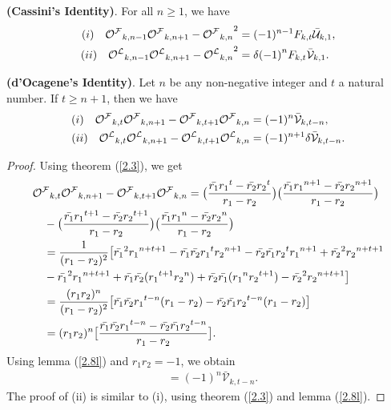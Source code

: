\begin{theorem}\textbf{(Cassini's Identity)}. For all $n\geq{1}$, we have\label{2.10t}
\begin{align*}
(i)\quad{{\mathcal{O^F}}}_{k,n-1}{{\mathcal{O^F}}}_{k,n+1}-{{{\mathcal{O^F}}}_{k,n}}^2&=(-1)^{n-1}F_{k,t}\bar{\mathcal{U}}_{k,1},\\
(ii)\quad{{\mathcal{O^L}}}_{k,n-1}{{\mathcal{O^L}}}_{k,n+1}-{{{\mathcal{O^L}}}_{k,n}}^2&=\delta{(-1)}^{n}{{F}_{k,t}}\bar{\mathcal{V}}_{k,1}.
\end{align*}
\end{theorem}
\begin{theorem}\textbf{(d'Ocagene's Identity)}. Let $n$ be any non-negative integer and $t$ a natural number. If $t\geq {n+1}$, then we have\label{2.11t}
\begin{align*}
(i)\quad{{\mathcal{O^F}}}_{k,t}{{\mathcal{O^F}}}_{k,n+1}-{{\mathcal{O^F}}}_{k,t+1}{{\mathcal{O^F}}}_{k,n}&=(-1)^n \bar{\mathcal{V}}_{k,t-n},\\
(ii)\quad{{\mathcal{O^L}}}_{k,t}{{\mathcal{O^L}}}_{k,n+1}-{{\mathcal{O^L}}}_{k,t+1}{{\mathcal{O^L}}}_{k,n}&=(-1)^{n+1}\delta \bar{\mathcal{V}}_{k,t-n}.
\end{align*}
\end{theorem}
\begin{proof}
Using theorem (\ref{2.3}), we get
\begin{align*}
&{{\mathcal{O^F}}}_{k,t}{{\mathcal{O^F}}}_{k,n+1}-{{\mathcal{O^F}}}_{k,t+1}{{\mathcal{O^F}}}_{k,n}=\big(\dfrac{\bar{r_1}{{r_1}}^{t}-\bar{r_2}{r_{2}}^{t}}{r_1-r_2}\big)\big(\dfrac{\bar{r_1}{{r_1}}^{n+1}-\bar{r_2}{r_{2}}^{n+1}}{r_1-r_2}\big)\\&\quad -\big(\dfrac{\bar{r_1}{{r_1}}^{t+1}-\bar{r_2}{r_{2}}^{t+1}}{r_1-r_2}\big)\big(\dfrac{\bar{r_1}{{r_1}}^{n}-\bar{r_2}{r_{2}}^{n}}{r_1-r_2}\big)\\
&\quad=\frac{1}{(r_1-r_2)^2}\big[{\bar{r_1}}^2{r_1}^{n+t+1}-{\bar{r_1}\bar{r_2}}{r_1}^{t}{r_2}^{n+1}-{\bar{r_2}\bar{r_1}}{r_2}^{t}{r_1}^{n+1}+{\bar{r_2}}^2{r_2}^{n+t+1}\\&\quad -{\bar{r_1}}^2{r_1}^{n+t+1}+{\bar{r_1}\bar{r_2}}{({r_1}^{t+1}{r_2}^n)}+{\bar{r_2}\bar{r_1}}{({r_1}^n{r_2}^{t+1})}-{\bar{r_2}}^2{r_2}^{n+t+1}\big]\\
&\quad =\frac{(r_1r_2)^n}{(r_1-r_2)^2}\big[\bar{r_1}\bar{r_2}{r_1}^{t-n}(r_1-r_2)-\bar{r_2}\bar{r_1}{r_2}^{t-n}(r_1-r_2)\big]\\
&\quad =(r_1r_2)^n\big[\frac{\bar{r_1}\bar{r_2}{r_1}^{t-n}-\bar{r_2}\bar{r_1}{r_2}^{t-n}}{r_1-r_2}\big].
\end{align*}
Using lemma (\ref{2.8l}) and $r_1r_2=-1$, we obtain
\begin{align*}
&=(-1)^n \bar{\mathcal{V}}_{k,t-n}.
\end{align*}
The proof of (ii) is similar to (i), using theorem (\ref{2.3}) and lemma (\ref{2.8l}).
\end{proof}
